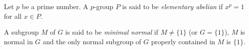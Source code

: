 





\begin{definition}
Let $p$ be a prime number. A $p$-group $P$ is said to be 
\emph{elementary abelian} if $x^p=1$ for all $x\in P$.
\end{definition}

\begin{definition}
A subgroup $M$ of $G$ is said to be \emph{minimal normal} if $M\ne\{1\}$
(or $G = \{1\}$),
$M$ is normal in $G$ and the only normal 
subgroup of $G$ properly contained in $M$ is $\{1\}$. 
\end{definition}

